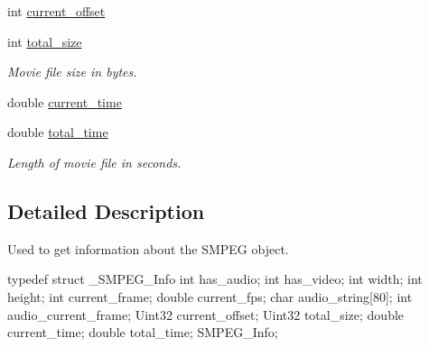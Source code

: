 \begin{DoxyCompactItemize}
int \hyperlink{struct_tao_1_1_sdl_1_1_smpeg_1_1_s_m_p_e_g___info_ad7f7739f936f6e67c9fc2c184b2e884e}{current\_\-offset}
\item 
int \hyperlink{struct_tao_1_1_sdl_1_1_smpeg_1_1_s_m_p_e_g___info_ac5c5e22bebc4d7c6980c1c329316353c}{total\_\-size}
\begin{DoxyCompactList}\small\item\em Movie file size in bytes. \item\end{DoxyCompactList}\item 
double \hyperlink{struct_tao_1_1_sdl_1_1_smpeg_1_1_s_m_p_e_g___info_a02b82c9426baf94993501cb78744de04}{current\_\-time}
\item 
double \hyperlink{struct_tao_1_1_sdl_1_1_smpeg_1_1_s_m_p_e_g___info_abc187661fe73006bad98670789d3d756}{total\_\-time}
\begin{DoxyCompactList}\small\item\em Length of movie file in seconds. \item\end{DoxyCompactList}\end{DoxyCompactItemize}


\subsection{Detailed Description}
Used to get information about the SMPEG object. 
\begin{DoxyCode}
                    typedef struct _SMPEG_Info {
                                int has_audio;
                                int has_video;
                                int width;
                                int height;
                                int current_frame;
                                double current_fps;
                                char audio_string[80];
                                int  audio_current_frame;
                                Uint32 current_offset;
                                Uint32 total_size;
                                double current_time;
                                double total_time;
                        } SMPEG_Info;
\end{DoxyCode}
 

